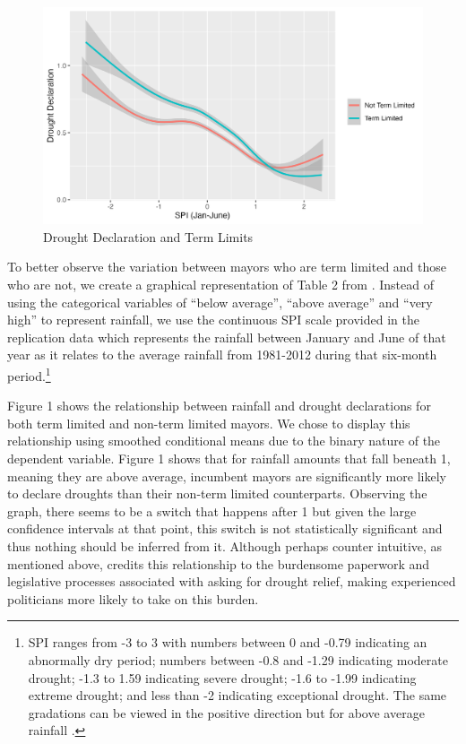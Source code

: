 \documentclass[12pt]{article}
\begin{document}
\begin{figure}[H]
  \caption{Drought Declaration and Term Limits}
  \includegraphics{Exhibits/figure1.pdf}
\end{figure}

To better observe the variation between mayors who are term limited and
those who are not, we create a graphical representation of Table 2 from
\citet{cooperman2021natural}. Instead of using the categorical variables
of ``below average'', ``above average'' and ``very high'' to represent
rainfall, we use the continuous SPI scale provided in the replication
data which represents the rainfall between January and June of that year
as it relates to the average rainfall from 1981-2012 during that
six-month period.\footnote{SPI ranges from -3 to 3 with numbers between
  0 and -0.79 indicating an abnormally dry period; numbers between -0.8
  and -1.29 indicating moderate drought; -1.3 to 1.59 indicating severe
  drought; -1.6 to -1.99 indicating extreme drought; and less than -2
  indicating exceptional drought. The same gradations can be viewed in
  the positive direction but for above average rainfall
  \citep{de2016drought}.}

Figure 1 shows the relationship between rainfall and drought
declarations for both term limited and non-term limited mayors. We chose
to display this relationship using smoothed conditional means due to the
binary nature of the dependent variable. Figure 1 shows that for
rainfall amounts that fall beneath 1, meaning they are above average,
incumbent mayors are significantly more likely to declare droughts than
their non-term limited counterparts. Observing the graph, there seems to
be a switch that happens after 1 but given the large confidence
intervals at that point, this switch is not statistically significant
and thus nothing should be inferred from it. Although perhaps counter
intuitive, as mentioned above, \citet{cooperman2021natural} credits this
relationship to the burdensome paperwork and legislative processes
associated with asking for drought relief, making experienced
politicians more likely to take on this burden.
\end{document}
